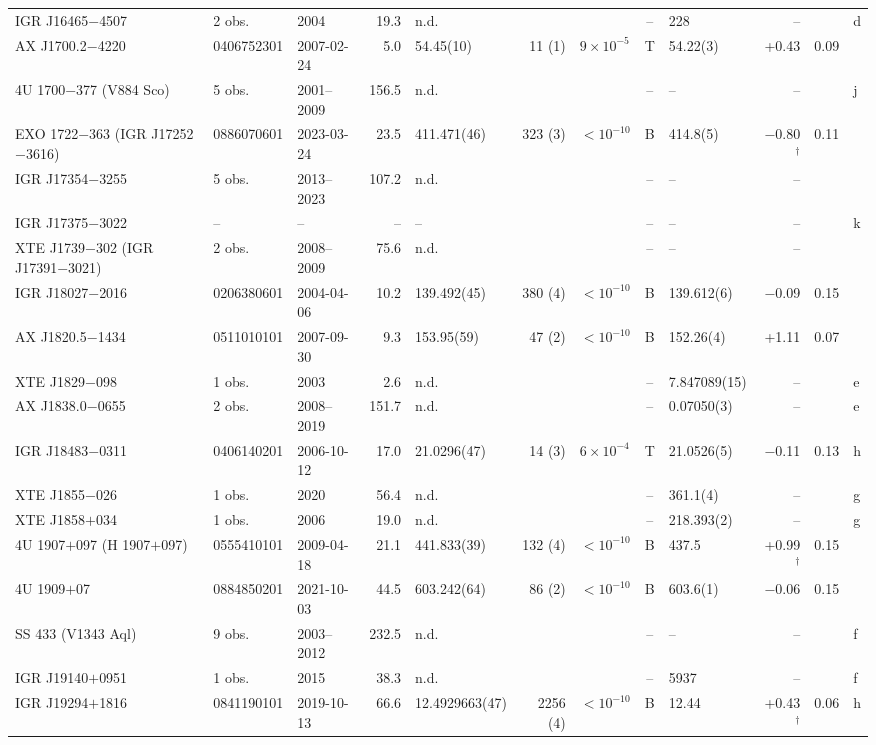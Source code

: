 \begin{longtable}{@{}l@{\hspace{5pt}\extracolsep{\fill}}l l r l r l c l r r l@{}}
IGR J16465$-$4507 & 2 obs. & 2004 & 19.3 & n.d. &  &  & -- & 228 & -- &  & d \\
AX J1700.2$-$4220 & 0406752301 & 2007-02-24 & 5.0 & 54.45(10) & 11 (1) & $9\times10^{-5}$ & T & 54.22(3) & +0.43 & 0.09 &  \\
4U 1700$-$377 (V884 Sco) & 5 obs. & 2001--2009 & 156.5 & n.d. &  &  & -- & -- & -- &  & j \\
EXO 1722$-$363 (IGR J17252$-$3616) & 0886070601 & 2023-03-24 & 23.5 & 411.471(46) & 323 (3) & $<10^{-10}$ & B & 414.8(5) & $-$0.80$^\dagger$ & 0.11 &  \\
IGR J17354$-$3255 & 5 obs. & 2013--2023 & 107.2 & n.d. &  &  & -- & -- & -- &  &  \\
IGR J17375$-$3022 & -- & -- & -- & -- &  &  & -- & -- & -- &  & k \\
XTE J1739$-$302 (IGR J17391$-$3021) & 2 obs. & 2008--2009 & 75.6 & n.d. &  &  & -- & -- & -- &  &  \\
IGR J18027$-$2016 & 0206380601 & 2004-04-06 & 10.2 & 139.492(45) & 380 (4) & $<10^{-10}$ & B & 139.612(6) & $-$0.09 & 0.15 &  \\
AX J1820.5$-$1434 & 0511010101 & 2007-09-30 & 9.3 & 153.95(59) & 47 (2) & $<10^{-10}$ & B & 152.26(4) & +1.11 & 0.07 &  \\
XTE J1829$-$098 & 1 obs. & 2003 & 2.6 & n.d. &  &  & -- & 7.847089(15) & -- &  & e \\
AX J1838.0$-$0655 & 2 obs. & 2008--2019 & 151.7 & n.d. &  &  & -- & 0.07050(3) & -- &  & e \\
IGR J18483$-$0311 & 0406140201 & 2006-10-12 & 17.0 & 21.0296(47) & 14 (3) & $6\times10^{-4}$ & T & 21.0526(5) & $-$0.11 & 0.13 & h \\
XTE J1855$-$026 & 1 obs. & 2020 & 56.4 & n.d. &  &  & -- & 361.1(4) & -- &  & g \\
XTE J1858$+$034 & 1 obs. & 2006 & 19.0 & n.d. &  &  & -- & 218.393(2) & -- &  & g \\
4U 1907$+$097 (H 1907$+$097) & 0555410101 & 2009-04-18 & 21.1 & 441.833(39) & 132 (4) & $<10^{-10}$ & B & 437.5 & +0.99$^\dagger$ & 0.15 &  \\
4U 1909$+$07 & 0884850201 & 2021-10-03 & 44.5 & 603.242(64) & 86 (2) & $<10^{-10}$ & B & 603.6(1) & $-$0.06 & 0.15 &  \\
SS 433 (V1343 Aql) & 9 obs. & 2003--2012 & 232.5 & n.d. &  &  & -- & -- & -- &  & f \\
IGR J19140$+$0951 & 1 obs. & 2015 & 38.3 & n.d. &  &  & -- & 5937 & -- &  & f \\
IGR J19294$+$1816 & 0841190101 & 2019-10-13 & 66.6 & 12.4929663(47) & 2256 (4) & $<10^{-10}$ & B & 12.44 & +0.43$^\dagger$ & 0.06 & h \\

\end{longtable}
